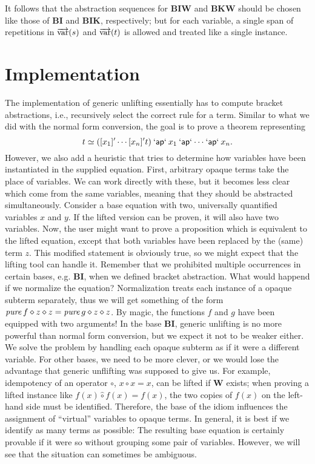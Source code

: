 It follows that the abstraction sequences for $\mathbf{BIW}$ and $\mathbf{BKW}$
should be chosen like those of $\mathbf{BI}$ and $\mathbf{BIK}$, respectively;
but for each variable, a single span of repetitions in $\overrightarrow{\operatorname{var}}(s)$ and
$\overrightarrow{\operatorname{var}}(t)$ is allowed and treated like a single instance.

\section{Implementation}\label{subsec:combinator-implementation}

The implementation of generic unlifting essentially has to compute bracket
abstractions, i.e., recursively select the correct rule for a term.
Similar to what we did with the normal form conversion, the goal is to prove a
theorem representing
\[ t \simeq ([x_1]'\cdots[x_n]'t) \mathbin{\mathsf{`ap`}} x_1 \mathbin{\mathsf{`ap`}} \cdots \mathbin{\mathsf{`ap`}} x_n. \]
However, we also add a heuristic that tries to determine how variables have
been instantiated in the supplied equation.
First, arbitrary opaque terms take the place of variables.
We can work directly with these, but it becomes less clear which come from the
same variables, meaning that they should be abstracted simultaneously.
Consider a base equation with two, universally quantified variables $x$ and $y$.
If the lifted version can be proven, it will also have two variables.
Now, the user might want to prove a proposition which is equivalent to the
lifted equation, except that both variables have been replaced by the
(same) term $z$.
This modified statement is obviously true, so we might expect that the lifting
tool can handle it.
Remember that we prohibited multiple occurrences in certain bases, e.g.
$\mathbf{BI}$, when we defined bracket abstraction.
What would happend if we normalize the equation?
Normalization treats each instance of a opaque subterm separately, thus we will
get something of the form $\operatorname{\mathit{pure}} f \diamond z \diamond z = \operatorname{\mathit{pure}} g \diamond z \diamond z$.
By magic, the functions $f$ and $g$ have been equipped with two arguments!
In the base $\mathbf{BI}$, generic unlifting is no more powerful than
normal form conversion, but we expect it not to be weaker either.
We solve the problem by handling each opaque subterm as if it were a different
variable.
For other bases, we need to be more clever, or we would lose the advantage
that generic unflifting was supposed to give us.
For example, idempotency of an operator $\circ$, $x \circ x = x$,
can be lifted if $\mathbf{W}$ exists;
when proving a lifted instance like $f(x) \hat\circ f(x) = f(x)$, the two
copies of $f(x)$ on the left-hand side must be identified.
Therefore, the base of the idiom influences the assignment of ``virtual''
variables to opaque terms.
In general, it is best if we identify as many terms as possible:
The resulting base equation is certainly provable if it were so without grouping
some pair of variables.
However, we will see that the situation can sometimes be ambiguous.

